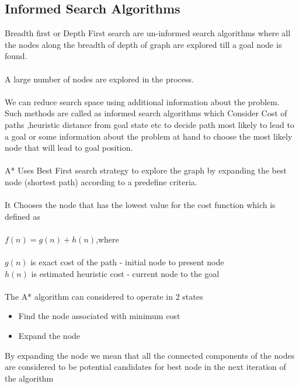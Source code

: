 \documentclass[fontsize=12pt, %
                             paper=a4, %
                             oneside, %
                             captions=tableheading,
                             index=totoc,
                             hyperref]{labbook}
\begin{document}
\subsection{Informed Search Algorithms}
Breadth first or Depth First search are un-informed search algorithms where all
the nodes along the breadth of depth of graph are explored till a goal node is found.
\\\\
A large number of nodes are explored in the process.
\\\\
We can reduce search space using additional information about the problem.
\\
Such methods are called as informed search algorithms which
Consider Cost of paths ,heuristic distance from goal state etc to decide path most likely to lead to a goal
or some information about the problem at hand to choose the most likely node that will
lead to goal position.
\\\\
A* Uses Best First search strategy to explore the graph by expanding the best node 
(shortest path) according to a predefine criteria.
\\\\
It Chooses the node that has the lowest value for the cost function which is defined as 
\\\\
$f(n) = g(n) + h(n)$,where 
\\\\
$g(n)$ is exact cost of the path - initial node to present node \\
$h(n)$ is estimated heuristic cost - current node to the goal 
\\\\
The A* algorithm can considered to operate in 2 states
\begin{itemize}
 \item {Find the node associated with minimum cost}
 \item {Expand the node }
\end{itemize}
By expanding the node we mean that all the connected components of the nodes
are considered to be potential candidates for best node in the next iteration of the algorithm
\\\\
\end{document}
